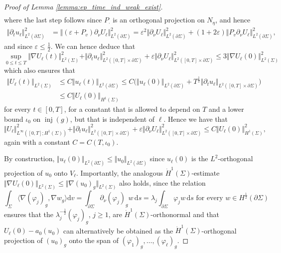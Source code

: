 \documentclass[10pt,reqno]{amsart}
\theoremstyle{plain}
\theoremstyle{definition}
\numberwithin{equation}{section}
\newcommand{\Si}{\Sigma}
\newcommand{\vph}{\varphi}
\newcommand{\vphi}{\varphi}
\newcommand{\ep}{\varepsilon}
\DeclareMathOperator{\inj}{inj}
\newcommand{\norm}[1]{\Vert#1\Vert}
\newcommand{\beq}{\begin{equation}}
\newcommand{\eeq}{\end{equation}}
\newcommand{\beqs}{\begin{equation*}}
\newcommand{\eeqs}{\end{equation*}}
\newcommand{\half}{\frac{1}{2}}
\newcommand{\dd}{\mathrm{d}} %
\newcommand{\na}{\nabla}
\newcommand{\pSi}{{\partial \Sigma}}
\newcommand{\hf}{\frac{1}{2}} %
\newcommand{\p}{\partial} %
\newcommand{\la}{\lambda} %
\begin{document}
\begin{proof}[Proof of Lemma \ref{lemma:ep_time_ind_weak_exist}]
\begin{align}
    \end{align}
    where the last step follows since $ P_{\cdot}$ is an orthogonal projection on $N_\eta$, and hence 
    \begin{align*}
        \norm{\p_t u_\ell}_{L^2(\p\Si)}^2&=\norm{(\ep + P_{v})\p_{\nu}U_\ell}_{L^2(\p\Si)}^2
        = \ep^2\norm{\p_{\nu} U_\ell}_{L^2(\p\Si)}^2 + (1 + 2\ep)\norm{P_{v}\p_{\nu}U_\ell}_{L^2(\p\Si)}^2,
    \end{align*} 
    and since $\ep\le \hf$. We can hence deduce that 
    \begin{equation}\label{est:galerkin_uniform}
        \sup_{0\le t\le T}\norm{\nabla U_\ell(t)}_{L^2(\Si)}^2 + \norm{\p_t u_\ell}_{L^2([0,T]\times\p\Si)}^2 + \ep\norm{\p_{\nu}U_\ell}_{L^2([0,T]\times\p\Si)}^2\leq 3\norm{\nabla U_\ell(0)}_{L^2(\Si)}^2
    \end{equation} 
    which also ensures that
    \begin{equation*}
        \begin{split}
            \norm{U_\ell(t)}_{L^2(\Si)} &\le C\norm{u_\ell(t)}_{L^2(\p\Si)} \le C\big(\norm{u_\ell(0)}_{L^2(\p\Si)} + T^{\half}\norm{\p_t u_\ell}_{L^2([0,T]\times\p\Si)}\big)\\
            &\le C\norm{U_\ell(0)}_{H^1(\Si)}
        \end{split}
    \end{equation*}
    for every $t\in [0,T]$, for a constant that is allowed to depend on $T$ and a lower bound $\iota_0$ on $\inj(g)$, but that is independent of $\ell$. 
    Hence we have that
    \beq\label{est:H1-Galerkin}
        \norm{ U_\ell}_{L^\infty([0,T];H^1(\Si))}^2+\norm{\p_t u_\ell}_{L^2([0,T]\times \p\Si)}^2 + \ep\norm{\p_{\nu} U_\ell}_{L^2([0,T]\times\p\Si)}^2\le C\norm{U_\ell(0)}_{H^1(\Si)}^2,
    \eeq
    again with a constant $C=C(T,\iota_0)$.  
    
    By construction, $\norm{u_\ell(0)}_{L^2(\p\Si)}\leq\norm{u_0}_{L^2(\p\Si)}$ since $u_\ell(0)$ is the $L^2$-orthogonal projection of $u_0$ onto $V_\ell$. Importantly, the analogous $\dot H^1(\Si)$-estimate $\norm{\nabla U_\ell(0)}_{L^2(\Si)}\leq \norm{\na (u_0)_g}_{L^2(\Si)}$ also holds, since the relation 
    \beqs
        \int_\Si\langle\nabla (\vph_j)_g,\nabla w_g\rangle\dd v = \int_{\p\Si}\p_{\nu}(\vph_j)_g w\,\dd s = \lambda_j\int_{\p\Si}\vph_j w \, \dd s \text{ for every } w\in H^\half(\pSi)
    \eeqs
    ensures that the $\la_j^{-\hf} (\vph_j)_g$, $j \geq 1$, are $\dot H^1(\Si)$-orthonormal and that $U_\ell(0)-a_0(u_0)$ can alternatively be obtained as the $\dot H^1(\Si)$-orthogonal projection of $(u_0)_g$ onto the span of $(\vphi_1)_g,\dots,(\vphi_\ell)_g$.
 

\end{proof}
\end{document}
